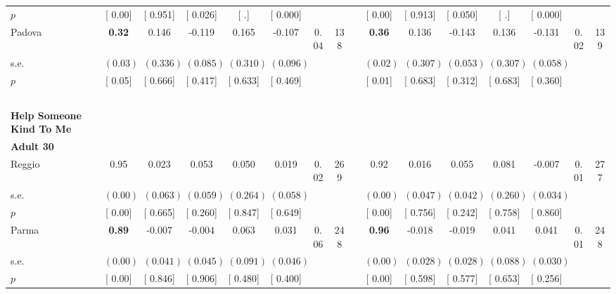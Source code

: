 \begin{longtable}{L{8em} c c c c c c c p{1em} c c c c c c c}
\quad \quad \quad \quad $ p$ & [     0.00] & [    0.951] & [    0.026] & [        .] & [    0.000] & & & & [     0.00] & [    0.913] & [    0.050] & [        .] & [    0.000] & &  \\[1em]
\quad \quad \quad Padova& \textbf{     0.32} &     0.146 &    -0.119 &     0.165 &    -0.107 &      0.04 &       138 & & \textbf{     0.36} &     0.136 &    -0.143 &     0.136 &    -0.131 &      0.02 &       139  \\*
\quad \quad \quad \quad s.e.& $ (     0.03)$ & $ (    0.336)$ & $ (    0.085)$ & $ (    0.310)$ & $ (    0.096)$ & & & & $ (     0.02)$ & $ (    0.307)$ & $ (    0.053)$ & $ (    0.307)$ & $ (    0.058)$ & &  \\*
\quad \quad \quad \quad $ p$ & [     0.05] & [    0.666] & [    0.417] & [    0.633] & [    0.469] & & & & [     0.01] & [    0.683] & [    0.312] & [    0.683] & [    0.360] & &  \\[1em]
~\\[1em]
\textbf{Help Someone Kind To Me} \\*
\quad \quad \textbf{Adult 30} & & & & & & & & & & & & & & & \\* 
\quad \quad \quad Reggio& 0.95 &     0.023 &     0.053 &     0.050 &     0.019 &      0.02 &       269 & & 0.92 &     0.016 &     0.055 &     0.081 &    -0.007 &      0.01 &       277  \\*
\quad \quad \quad \quad s.e.& $ (     0.00)$ & $ (    0.063)$ & $ (    0.059)$ & $ (    0.264)$ & $ (    0.058)$ & & & & $ (     0.00)$ & $ (    0.047)$ & $ (    0.042)$ & $ (    0.260)$ & $ (    0.034)$ & &  \\*
\quad \quad \quad \quad $ p$ & [     0.00] & [    0.665] & [    0.260] & [    0.847] & [    0.649] & & & & [     0.00] & [    0.756] & [    0.242] & [    0.758] & [    0.860] & &  \\[1em]
\quad \quad \quad Parma& \textbf{     0.89} &    -0.007 &    -0.004 &     0.063 &     0.031 &      0.06 &       248 & & \textbf{     0.96} &    -0.018 &    -0.019 &     0.041 &     0.041 &      0.01 &       248  \\*
\quad \quad \quad \quad s.e.& $ (     0.00)$ & $ (    0.041)$ & $ (    0.045)$ & $ (    0.091)$ & $ (    0.046)$ & & & & $ (     0.00)$ & $ (    0.028)$ & $ (    0.028)$ & $ (    0.088)$ & $ (    0.030)$ & &  \\*
\quad \quad \quad \quad $ p$ & [     0.00] & [    0.846] & [    0.906] & [    0.480] & [    0.400] & & & & [     0.00] & [    0.598] & [    0.577] & [    0.653] & [    0.256] & &  \\[1em]

\end{longtable}
